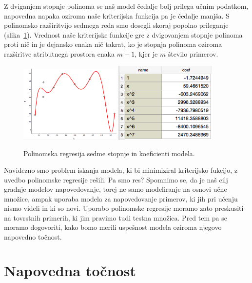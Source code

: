 Z dviganjem stopnje polinoma se naš model čedalje bolj prilega učnim podatkom, napovedna napaka oziroma naše kriterijska funkcija pa je čedalje manjša. S polinomsko razširitvijo sedmega reda smo dosegli skoraj popolno prileganje (slika~\ref{fig:poly-linear-fit7}). Vrednost naše kriterijske funkcije gre z dvigovanjem stopnje polinoma proti nič in je dejansko enaka nič takrat, ko je stopnja polinoma oziroma razširitve atributnega prostora enaka $m-1$, kjer je $m$ število primerov.

\begin{figure}[htbp]
\begin{center}
  \includegraphics[width=0.45\textwidth]{slike/poly-reg-7.png}
  \hfill
  \includegraphics[width=0.45\textwidth]{slike/poly-reg-7-coeff.png}
\caption{Polinomska regresija sedme stopnje in koeficienti modela.}
\label{fig:poly-linear-fit7}
\end{center}
\end{figure}

Navidezno smo problem iskanja modela, ki bi minimiziral kriterijsko fukcijo, z uvedbo polinomske regresije rešili. Pa smo res? Spomnimo se, da je naš cilj gradnje modelov napovedovanje, torej ne samo modeliranje na osnovi učne množice, ampak uporaba modela za napovedovanje primerov, ki jih pri učenju nismo videli in ki so novi. Uporabo polinomske regresije moramo zato preskusiti na tovrstnih primerih, ki jim pravimo tudi testna množica. Pred tem pa se moramo dogovoriti, kako bomo merili uspešnost modela oziroma njegovo napovedno točnost.

\section{Napovedna točnost}

